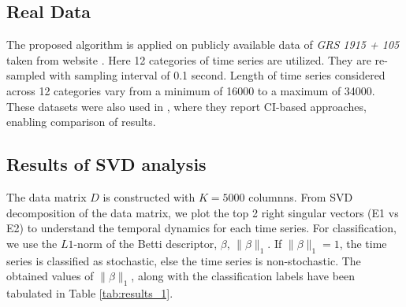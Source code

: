 \documentclass[journal]{IEEEtran}
\begin{document}
	\subsection{Real Data}
	The proposed algorithm is applied on publicly available data of \textit{GRS 1915 + 105} taken from website \cite{xte}. Here 12 categories of time series are utilized. They are re-sampled with sampling interval of 0.1 second. Length of time series considered across 12 categories vary from a minimum of 16000 to a maximum of 34000. These datasets  were  also used in \cite{Adegoke2018}, where they report CI-based approaches, enabling comparison of results.

	\subsection{Results of SVD analysis}
	
	
	The data matrix $D$ is constructed with $K=5000$ columnns. From SVD decomposition of the data matrix, we plot the top 2 right singular vectors (E1 vs E2) to understand the temporal dynamics for each time series. For classification, we use the $L1$-norm of the Betti descriptor, $\beta$, $\|\beta\|_1$. If $\|\beta\|_1 = 1$, the time series is classified as stochastic, else the time series is non-stochastic. The obtained values of $\|\beta\|_1$, along with the classification labels have been tabulated in Table \ref{tab:results_1}.
%	
	
\end{document}
